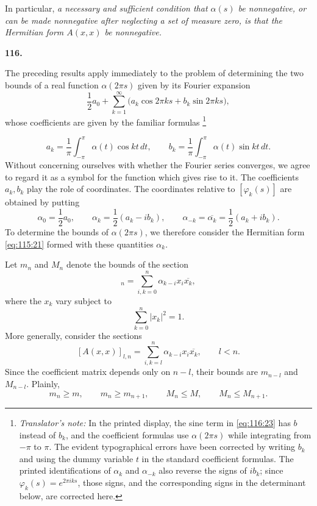 \documentclass[
  paper=b5,
  fontsize=13pt,
  twoside=true,
  open=any,
  bookmarkpackage=false,
  chapterprefix=true,
  headings=normal
]{scrbook}
\theoremstyle{definition}
\newcommand{\numberedparagraph}[1]{%
  \par\medskip\phantomsection\label{sec:#1}%
  \noindent\textbf{#1.}\enspace
}
\newcounter{translatornote}
\newcommand{\translatornotelabel}{T\arabic{translatornote}}
\newcommand{\translatornote}[1]{%
  \stepcounter{translatornote}%
  \begingroup
    \edef\savedfootnotenumber{\number\value{footnote}}%
    \renewcommand{\thefootnote}{\translatornotelabel}%
    \footnote{\emph{Translator's note:} #1}%
    \setcounter{footnote}{\savedfootnotenumber}%
  \endgroup
}
\begin{document}
In particular, \emph{a necessary and sufficient condition that
\(\alpha(s)\) be nonnegative, or can be made nonnegative after neglecting a
set of measure zero, is that the Hermitian form \(A(x,x)\) be nonnegative.}

\numberedparagraph{116}
The preceding results apply immediately to the problem of determining the two
bounds of a real function \(\alpha(2\pi s)\) given by its Fourier expansion
\begin{equation}
  \frac12a_0+\sum_{k=1}^{\infty}
  \bigl(a_k\cos2\pi ks+b_k\sin2\pi ks\bigr),
  \tag{23}\label{eq:116:23}
\end{equation}
whose coefficients are given by the familiar
formulas\translatornote{In the printed display, the sine term in
\eqref{eq:116:23} has \(b\) instead of \(b_k\), and the coefficient formulas
use \(\alpha(2\pi s)\) while integrating from \(-\pi\) to \(\pi\).  The
evident typographical errors have been corrected by writing \(b_k\) and using
the dummy variable \(t\) in the standard coefficient formulas.  The printed
identifications of \(\alpha_k\) and \(\alpha_{-k}\) also reverse the signs of
\(ib_k\); since \(\varphi_k(s)=e^{2\pi iks}\), those signs, and the
corresponding signs in the determinant below, are corrected here.}
\[
  a_k=\frac1\pi\int_{-\pi}^{\pi}\alpha(t)\cos kt\,dt,
  \qquad
  b_k=\frac1\pi\int_{-\pi}^{\pi}\alpha(t)\sin kt\,dt.
\]
Without concerning ourselves with whether the Fourier series converges, we
agree to regard it as a symbol for the function which gives rise to it.  The
coefficients \(a_k,b_k\) play the role of coordinates.  The coordinates
relative to \([\varphi_k(s)]\) are obtained by putting
\[
  \alpha_0=\frac12a_0,
  \qquad
  \alpha_k=\frac12(a_k-ib_k),
  \qquad
  \alpha_{-k}=\overline{\alpha_k}=\frac12(a_k+ib_k).
\]
To determine the bounds of \(\alpha(2\pi s)\), we therefore consider the
Hermitian form \eqref{eq:115:21} formed with these quantities \(\alpha_k\).

Let \(m_n\) and \(M_n\) denote the bounds of the section
\begin{equation}
  [A(x,x)]_n=\sum_{i,k=0}^{n}\alpha_{k-i}x_i\overline{x_k},
  \tag{24}\label{eq:116:24}
\end{equation}
where the \(x_k\) vary subject to
\[
  \sum_{k=0}^{n}|x_k|^2=1.
\]
More generally, consider the sections
\[
  [A(x,x)]_{l,n}=\sum_{i,k=l}^{n}\alpha_{k-i}x_i\overline{x_k},
  \qquad l<n.
\]
Since the coefficient matrix depends only on \(n-l\), their bounds are
\(m_{n-l}\) and \(M_{n-l}\).  Plainly,
\[
  m_n\ge m,\qquad m_n\ge m_{n+1},\qquad
  M_n\le M,\qquad M_n\le M_{n+1}.
\]
\end{document}
